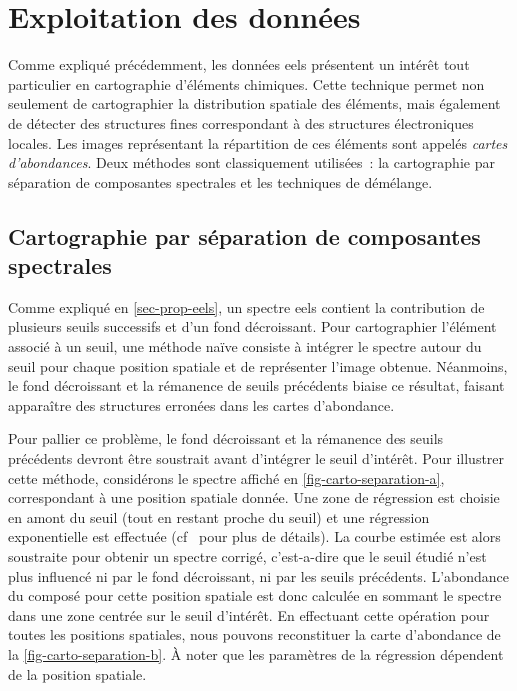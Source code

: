     \section{Exploitation des données }\label{sec-exploitation-eels}

    Comme expliqué précédemment, les données \gls{eels} présentent un intérêt tout particulier en cartographie d'éléments chimiques. Cette technique permet non seulement de cartographier la distribution spatiale des éléments, mais également de détecter des structures fines correspondant à des structures électroniques locales. Les images représentant la répartition de ces éléments sont appelés \emph{cartes d'abondances}. Deux méthodes sont classiquement utilisées~: la cartographie par séparation de composantes spectrales et les techniques de démélange.

    \subsection{Cartographie par séparation de composantes spectrales}

    Comme expliqué en \cref{sec-prop-eels}, un spectre \gls{eels} contient la contribution de plusieurs seuils successifs et d'un fond décroissant. Pour cartographier l'élément associé à un seuil, une méthode naïve consiste à intégrer le spectre autour du seuil pour chaque position spatiale et de représenter l'image obtenue. Néanmoins, le fond décroissant et la rémanence de seuils précédents biaise ce résultat, faisant apparaître des structures erronées dans les cartes d'abondance.

    Pour pallier ce problème, le fond décroissant et la rémanence des seuils précédents devront être soustrait avant d'intégrer le seuil d'intérêt. Pour illustrer cette méthode, considérons le spectre affiché en \cref{fig-carto-separation-a}, correspondant à une position spatiale donnée. Une zone de régression est choisie en amont du seuil (tout en restant proche du seuil) et une régression exponentielle est effectuée (cf~\cite[Section~4.4]{egerton2011electron} pour plus de détails). La courbe estimée est alors soustraite pour obtenir un spectre corrigé, c'est-a-dire que le seuil étudié n'est plus influencé ni par le fond décroissant, ni par les seuils précédents. L'abondance du composé pour cette position spatiale est donc calculée en sommant le spectre dans une zone centrée sur le seuil d'intérêt. En effectuant cette opération pour toutes les positions spatiales, nous pouvons reconstituer la carte d'abondance de la \cref{fig-carto-separation-b}. \`A noter que les paramètres de la régression dépendent de la position spatiale.

